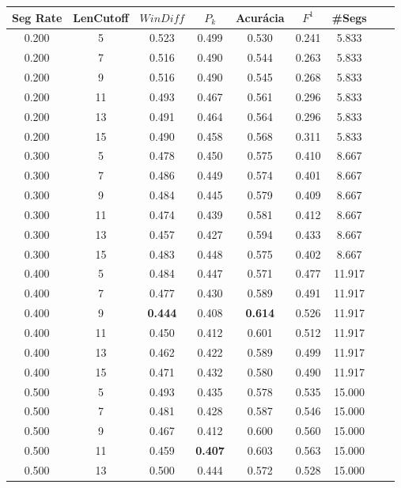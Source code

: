 \documentclass{article}
\begin{document}
\begin{longtable}[c]{|c|c|c|c|c|c|c|c|c|} 
\hline 
 Seg Rate & LenCutoff & $WinDiff$ & $P_k$ & Acurácia & $F^1$ & \#Segs\\ \hline 
 0.200 & 5 & 0.523 & 0.499 & 0.530 & 0.241 & 5.833  \\ \hline 
 0.200 & 7 & 0.516 & 0.490 & 0.544 & 0.263 & 5.833  \\ \hline 
 0.200 & 9 & 0.516 & 0.490 & 0.545 & 0.268 & 5.833  \\ \hline 
 0.200 & 11 & 0.493 & 0.467 & 0.561 & 0.296 & 5.833  \\ \hline 
 0.200 & 13 & 0.491 & 0.464 & 0.564 & 0.296 & 5.833  \\ \hline 
 0.200 & 15 & 0.490 & 0.458 & 0.568 & 0.311 & 5.833  \\ \hline 
 0.300 & 5 & 0.478 & 0.450 & 0.575 & 0.410 & 8.667  \\ \hline 
 0.300 & 7 & 0.486 & 0.449 & 0.574 & 0.401 & 8.667  \\ \hline 
 0.300 & 9 & 0.484 & 0.445 & 0.579 & 0.409 & 8.667  \\ \hline 
 0.300 & 11 & 0.474 & 0.439 & 0.581 & 0.412 & 8.667  \\ \hline 
 0.300 & 13 & 0.457 & 0.427 & 0.594 & 0.433 & 8.667  \\ \hline 
 0.300 & 15 & 0.483 & 0.448 & 0.575 & 0.402 & 8.667  \\ \hline 
 0.400 & 5 & 0.484 & 0.447 & 0.571 & 0.477 & 11.917  \\ \hline 
 0.400 & 7 & 0.477 & 0.430 & 0.589 & 0.491 & 11.917  \\ \hline 
 0.400 & 9 & \cellcolor{gray!20} \textbf{0.444} & 0.408 & \cellcolor{gray!20} \textbf{0.614} & 0.526 & 11.917  \\ \hline 
 0.400 & 11 & 0.450 & 0.412 & 0.601 & 0.512 & 11.917  \\ \hline 
 0.400 & 13 & 0.462 & 0.422 & 0.589 & 0.499 & 11.917  \\ \hline 
 0.400 & 15 & 0.471 & 0.432 & 0.580 & 0.490 & 11.917  \\ \hline 
 0.500 & 5 & 0.493 & 0.435 & 0.578 & 0.535 & 15.000  \\ \hline 
 0.500 & 7 & 0.481 & 0.428 & 0.587 & 0.546 & 15.000  \\ \hline 
 0.500 & 9 & 0.467 & 0.412 & 0.600 & 0.560 & 15.000  \\ \hline 
 0.500 & 11 & 0.459 & \cellcolor{gray!20} \textbf{0.407} & 0.603 & 0.563 & 15.000  \\ \hline 
 0.500 & 13 & 0.500 & 0.444 & 0.572 & 0.528 & 15.000  \\ \hline 

\end{longtable}
\end{document}
